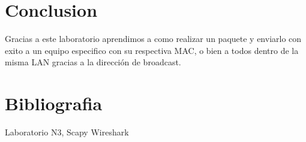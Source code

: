 \documentclass{article}
\begin{document}
\section{Conclusion}
Gracias a este laboratorio aprendimos a como realizar un paquete y enviarlo con exito a un equipo especifico con su respectiva MAC, o bien a todos dentro de la misma LAN gracias a la dirección de broadcast.

\section{Bibliografia}
Laboratorio N3, Scapy Wireshark\\
\end{document}
